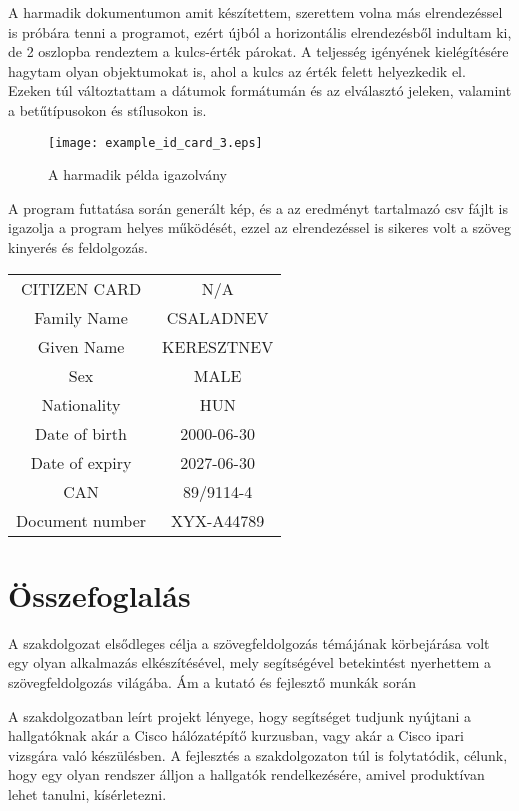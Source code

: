 \documentclass[12pt]{report}
\begin{document}
A harmadik dokumentumon amit készítettem, szerettem volna más elrendezéssel is próbára tenni a programot, ezért újból a horizontális elrendezésből indultam ki, de 2 oszlopba rendeztem a kulcs-érték párokat. A teljesség igényének kielégítésére hagytam olyan objektumokat is, ahol a kulcs az érték felett helyezkedik el. Ezeken túl változtattam a dátumok formátumán és az elválasztó jeleken, valamint a betűtípusokon és stílusokon is.

\begin{figure}[h]
    \centerline{\texttt{[image: example\_id\_card\_3.eps]}}
    \caption{A harmadik példa igazolvány}
\end{figure}

A program futtatása során generált kép, és a az eredményt tartalmazó csv fájlt is igazolja a program helyes működését, ezzel az elrendezéssel is sikeres volt a szöveg kinyerés és feldolgozás.

\begin{tcolorbox}
    \begin{center}
        \begin{tabular}{ c c }
            CITIZEN CARD & N/A \\ 
            Family Name & CSALADNEV \\ 
            Given Name & KERESZTNEV \\ 
            Sex & MALE \\ 
            Nationality & HUN \\ 
            Date of birth & 2000-06-30 \\ 
            Date of expiry & 2027-06-30 \\ 
            CAN & 89/9114-4 \\ 
            Document number & XYX-A44789 \\ 
        \end{tabular}
    \end{center}
\end{tcolorbox}

\section{Összefoglalás}

A szakdolgozat elsődleges célja a szövegfeldolgozás témájának körbejárása volt egy olyan alkalmazás elkészítésével, mely segítségével betekintést nyerhettem a szövegfeldolgozás világába. Ám a kutató és fejlesztő munkák során 

A szakdolgozatban leírt projekt lényege, hogy segítséget tudjunk nyújtani a hallgatóknak akár a Cisco hálózatépítő kurzusban, vagy akár a Cisco ipari vizsgára való készülésben. A fejlesztés a szakdolgozaton túl is folytatódik, célunk, hogy egy olyan rendszer álljon a hallgatók rendelkezésére, amivel produktívan lehet tanulni, kísérletezni.
\end{document}
